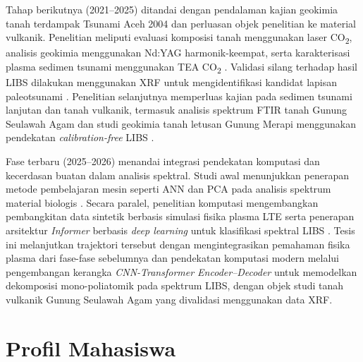 \documentclass[12pt, a4paper]{article}
\begin{document}
Tahap berikutnya (2021--2025) ditandai dengan pendalaman kajian geokimia tanah terdampak Tsunami Aceh 2004 dan perluasan objek penelitian ke material vulkanik. Penelitian meliputi evaluasi komposisi tanah menggunakan laser CO\textsubscript{2}, analisis geokimia menggunakan Nd:YAG harmonik-keempat, serta karakterisasi plasma sedimen tsunami menggunakan TEA CO\textsubscript{2} \citep{sari_new_2021, idris_geochemistry_2022, mitaphonna_characteristics_2023}. Validasi silang terhadap hasil LIBS dilakukan menggunakan XRF untuk mengidentifikasi kandidat lapisan paleotsunami \citep{ramli_elemental_2023-1, mitaphonna_x-ray_2023}. Penelitian selanjutnya memperluas kajian pada sedimen tsunami lanjutan dan tanah vulkanik, termasuk analisis spektrum FTIR tanah Gunung Seulawah Agam dan studi geokimia tanah letusan Gunung Merapi menggunakan pendekatan \textit{calibration-free} LIBS \citep{mitaphonna_pulsed_2024, mitaphonna_preliminary_2024, aliandri_evaluation_2025, khumaeni_analysis_2025}.

Fase terbaru (2025--2026) menandai integrasi pendekatan komputasi dan kecerdasan buatan dalam analisis spektral. Studi awal menunjukkan penerapan metode pembelajaran mesin seperti ANN dan PCA pada analisis spektrum material biologis \citep{subki_analysis_2025, qusthalani_comparing_2025}. Secara paralel, penelitian komputasi mengembangkan pembangkitan data sintetik berbasis simulasi fisika plasma LTE serta penerapan arsitektur \textit{Informer} berbasis \textit{deep learning} untuk klasifikasi spektral LIBS \citep{walidain_spectroscopic_2025, walidain_informer-based_2026}. Tesis ini melanjutkan trajektori tersebut dengan mengintegrasikan pemahaman fisika plasma dari fase-fase sebelumnya dan pendekatan komputasi modern melalui pengembangan kerangka \textit{CNN-Transformer Encoder--Decoder} untuk memodelkan dekomposisi mono-poliatomik pada spektrum LIBS, dengan objek studi tanah vulkanik Gunung Seulawah Agam yang divalidasi menggunakan data XRF.

\section{Profil Mahasiswa}

\newpage

\end{document}
